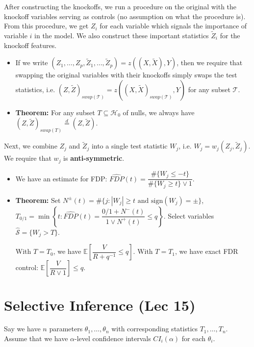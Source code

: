 \documentclass[twoside]{article}
\newcommand\bbE{\mathbb{E}}
\newcommand\calH{\mathcal{H}}
\def\t{\theta}
\begin{document}
After constructing the knockoffs, we run a procedure on the original with the knockoff variables serving as controls (no assumption on what the procedure is). From this procedure, we get $Z_i$ for each variable which signals the importance of variable $i$ in the model. We also construct these important statistics $\widetilde{Z}_i$ for the knockoff features.
\begin{itemize}
\item If we write $(Z_1, \dots, Z_p, \widetilde{Z}_1, \dots, \widetilde{Z}_p) = z((X, \widetilde{X}), Y)$, then we require that swapping the original variables with their knockoffs simply swaps the test statistics, i.e. $(Z, \widetilde{Z})_{swap(\mathcal{T})} = z((X, \widetilde{X})_{swap(\mathcal{T})}, Y)$ for any subset $\mathcal{T}$.

\item \textbf{Theorem:} For any subset $T \subseteq \calH_0$ of nulls, we always have $(Z, \widetilde{Z})_{swap(T)} \stackrel{d}{=} (Z, \widetilde{Z})$.
\end{itemize}

Next, we combine $Z_j$ and $\widetilde{Z}_j$ into a single test statistic $W_j$, i.e. $W_j = w_j (Z_j, \widetilde{Z}_j)$. We require that $w_j$ is \textbf{anti-symmetric}.

\begin{itemize}
\item We have an estimate for FDP: $\widehat{FDP}(t) = \dfrac{\#\{W_j \leq -t\}}{\#\{W_j \geq t\} \vee 1}$.

\item \textbf{Theorem:} Set $N^\pm(t) = \# \{ j: |W_j| \geq t \text{ and } \text{sign}(W_j) = \pm \}$, $T_{0/1} = \min \left\{ t: \widehat{FDP}(t) = \dfrac{0/1 + N^-(t)}{1 \vee N^+(t)} \leq q \right\}$. Select variables $\hat{\mathcal{S}} = \{ W_j > T\}$.

With $T = T_0$, we have $\bbE \left[\dfrac{V}{R + q^{-1}} \leq q \right]$. With $T = T_1$, we have exact FDR control: $\bbE \left[\dfrac{V}{R \vee 1} \right] \leq q$.
\end{itemize}

\section{Selective Inference (Lec 15)}
Say we have $n$ parameters $\t_1, \dots, \t_n$ with corresponding statistics $T_1, \dots, T_n$. Assume that we have $\alpha$-level confidence intervals $CI_i(\alpha)$ for each $\t_i$.
\end{document}
